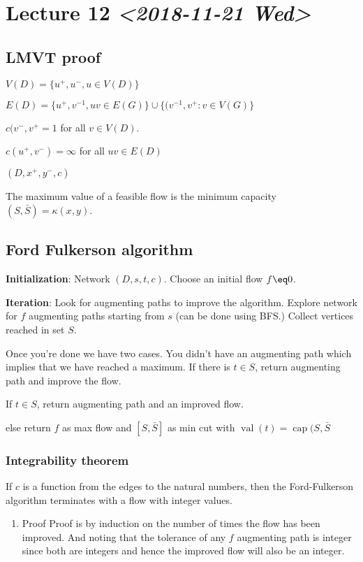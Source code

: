 \documentclass[11pt]{article}
\def\val{\operatorname{val}}
\begin{document}
{\section{Lecture 12 \textit{<2018-11-21 Wed>}}
\label{sec:orgc9fc261}
\subsection{LMVT proof}
\label{sec:org058234e}
\(V(D) = \{u^{+}, u^{-}, u \in V(D)\}\)

\(E(D) = \{u^{+}, v^{-1}, uv \in E(G)\} \cup \{(v^{-1}, v^{+}\colon v\in
   V(G)\}\)

\(c(v^{-}, v^{+} =1\) for all \(v \in V(D)\).

\(c(u^+, v^-) = \infty\) for all \(uv \in E(D)\)

\((D, x^+, y^-, c)\)

The maximum value of a feasible flow is the minimum capacity \((S, \bar{S}) =
   \kappa(x, y)\).
\subsection{Ford Fulkerson algorithm}
\label{sec:orgb9f9933}
\textbf{Initialization}: Network \((D, s, t, c)\). Choose an initial flow \(f \eq 0\).

\textbf{Iteration}: Look for augmenting paths to improve the algorithm. Explore
 network for \(f\) augmenting paths starting from \(s\) (can be done using BFS.)
 Collect vertices reached in set \(S\).

Once you're done we have two cases. You didn't have an augmenting path which
implies that we have reached a maximum. If there is \(t\in S\), return
augmenting path and improve the flow.

If \(t\in S\), return augmenting path and an improved flow.

else return \(f\) as max flow and \([S, \bar{S}]\) as min cut with \(\val(t) =
    \operatorname{cap}(S, \bar{S}\)

\subsubsection{Integrability theorem}
\label{sec:orgdca4f77}
If \(c\) is a function from the edges to the natural numbers, then the
Ford-Fulkerson algorithm terminates with a flow with integer values.
\begin{enumerate}
\item Proof
\label{sec:org2643eb2}
Proof is by induction on the number of times the flow has been improved.
And noting that the tolerance of any \(f\) augmenting path is integer since
both are integers and hence the improved flow will also be an integer.


\end{enumerate}}
\end{document}
